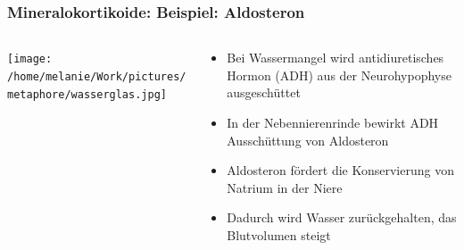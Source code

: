 \documentclass{beamer}
\begin{document}
\begin{frame}
\frametitle{Mineralokortikoide: Beispiel: Aldosteron}

\pause

\begin{columns}[c]
\begin{column}{3cm}

\begin{center}
 \texttt{[image: /home/melanie/Work/pictures/metaphore/wasserglas.jpg]}
\end{center}

\end{column}

\begin{column}{7cm}
\begin{itemize}
\item
Bei Wassermangel wird antidiuretisches Hormon (ADH) aus der Neurohypophyse ausgeschüttet
\pause
\item
In der Nebennierenrinde bewirkt ADH Ausschüttung von Aldosteron
\pause
\item
Aldosteron fördert die Konservierung von Natrium in der Niere
\pause
\item
Dadurch wird Wasser zurückgehalten, das Blutvolumen steigt
\end{itemize}
\end{column}

\end{columns}

\end{frame}



\end{document}
